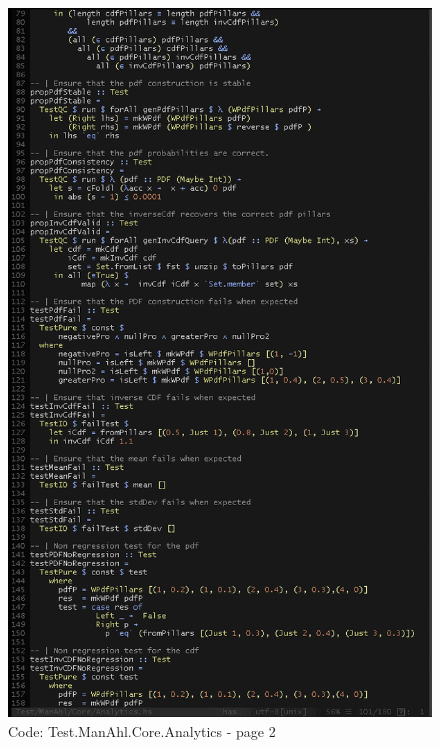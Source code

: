 \documentclass[12pt,a4paper,article]{memoir} %
\begin{document}
\begin{figure}[h!]
\centering
\includegraphics[width=1\textwidth]{img/code-test-analytics-2.png}
\caption{Code: Test.ManAhl.Core.Analytics - page 2}
\label{fig:test.a2}
\end{figure}
\end{document}
